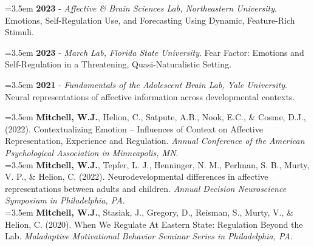 

\begin{sloppypar}
\begin{small}

\hangindent=3.5em
\textbf{2023} - \textit{Affective \& Brain Sciences Lab, Northeastern University}. Emotions, Self-Regulation Use, and Forecasting Using Dynamic, Feature-Rich Stimuli. \newline

\hangindent=3.5em
\textbf{2023} - \textit{March Lab, Florida State University}. Fear Factor: Emotions and Self-Regulation in a Threatening, Quasi-Naturalistic Setting.  \newline

\hangindent=3.5em
\textbf{2021} - \textit{Fundamentals of the Adolescent Brain Lab, Yale University}. Neural representations of affective information across developmental contexts.  \\

\end{small}
\end{sloppypar}


\hangindent=3.5em
\textbf{Mitchell, W.J.}, Helion, C., Satpute, A.B., Nook, E.C., \& Cosme, D.J., (2022). Contextualizing Emotion – Influences of Context on Affective Representation, Experience and Regulation. \textit{Annual Conference of the American Psychological Association in Minneapolis, MN}.\\

\hangindent=3.5em
\textbf{Mitchell, W.J.}, Tepfer, L. J., Henninger, N. M., Perlman, S. B., Murty, V. P., \& Helion, C. (2022). Neurodevelopmental differences in affective representations between adults and children. \textit{Annual Decision Neuroscience Symposium in Philadelphia, PA}.\\

\hangindent=3.5em
\textbf{Mitchell, W.J.}, Stasiak, J., Gregory, D., Reisman, S., Murty, V., \& Helion, C. (2020). When We Regulate At Eastern State: Regulation
Beyond the Lab. \textit{Maladaptive Motivational Behavior Seminar Series in Philadelphia, PA}. \\

